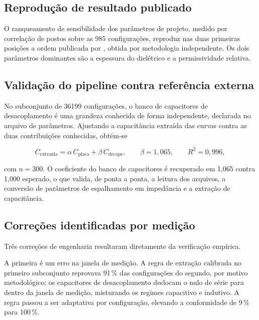 \subsection{Reprodução de resultado publicado}
\label{subsec:reproducao}

O ranqueamento de sensibilidade dos parâmetros de projeto, medido por correlação
de postos sobre as 985 configurações, reproduz nas duas primeiras posições a
ordem publicada por \citet{schierholz2023}, obtida por metodologia
independente. Os dois parâmetros dominantes são a espessura do dielétrico e a
permissividade relativa.

\subsection{Validação do pipeline contra referência externa}
\label{subsec:validacao_pipeline}

No subconjunto de 36199 configurações, o banco de capacitores de desacoplamento
é uma grandeza conhecida de forma independente, declarada no arquivo de
parâmetros. Ajustando a capacitância extraída das curvas contra as duas
contribuições conhecidas, obtém-se

\begin{equation}
C_{\text{extraída}} = \alpha \, C_{\text{placa}} + \beta \, C_{\text{decaps}},
\qquad \beta = 1{,}065, \qquad R^2 = 0{,}996,
\label{eq:validacao}
\end{equation}

\noindent com $n = 300$. O coeficiente do banco de capacitores é recuperado em
1,065 contra 1,000 esperado, o que valida, de ponta a ponta, a leitura dos
arquivos, a conversão de parâmetros de espalhamento em impedância e a extração de
capacitância.

\subsection{Correções identificadas por medição}
\label{subsec:correcoes}

Três correções de engenharia resultaram diretamente da verificação empírica.

A primeira é um erro na janela de medição. A regra de extração calibrada no
primeiro subconjunto reprovava 91\,\% das configurações do segundo, por motivo
metodológico: os capacitores de desacoplamento deslocam o nulo de série para
dentro da janela de medição, misturando os regimes capacitivo e indutivo. A regra
passou a ser adaptativa por configuração, elevando a conformidade de 9\,\% para
100\,\%.

